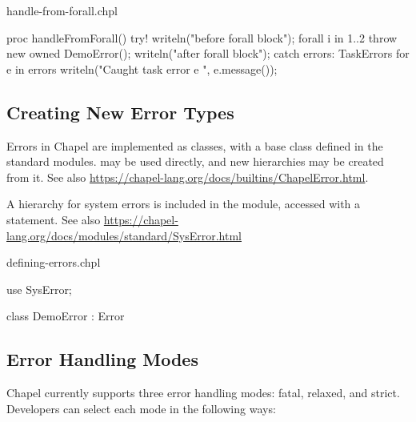 \begin{chapelexample}{handle-from-forall.chpl}
\begin{chapel}
proc handleFromForall() {
  try! {
    writeln("before forall block");
    forall i in 1..2 {
      throw new owned DemoError();
    }
    writeln("after forall block");
  } catch errors: TaskErrors {
    for e in errors {
      writeln("Caught task error e ", e.message());
    }
  }
}
\end{chapel}
\begin{chapelpost}
\end{chapelpost}
\begin{chapeloutput}
\end{chapeloutput}
\end{chapelexample}

\subsection{Creating New Error Types}
\label{Creating_New_Error_Types}

Errors in Chapel are implemented as classes, with a base class 
defined in the standard modules.  may be used directly, and new
hierarchies may be created from it.  See also
\url{https://chapel-lang.org/docs/builtins/ChapelError.html}.

A hierarchy for system errors is included in the  module,
accessed with a  statement.  See also
\url{https://chapel-lang.org/docs/modules/standard/SysError.html}

\begin{chapelexample}{defining-errors.chpl}
\begin{chapel}
use SysError;

class DemoError : Error { }
\end{chapel}
\begin{chapelpost}
\end{chapelpost}
\begin{chapeloutput}
\end{chapeloutput}
\end{chapelexample}

\subsection{Error Handling Modes}
\label{Error_Handling_Modes}

Chapel currently supports three error handling modes: fatal, relaxed, and
strict. Developers can select each mode in the following ways:

